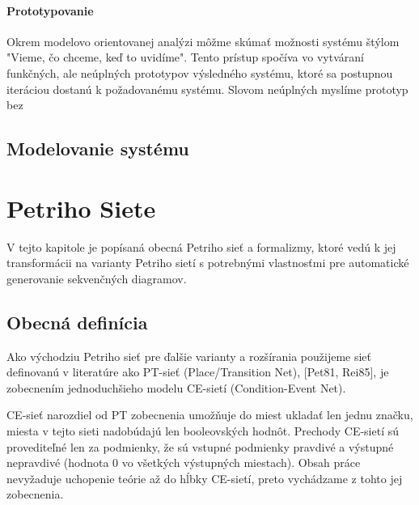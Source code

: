 \subsubsection{Prototypovanie}
Okrem modelovo orientovanej analýzi môžme skúmať možnosti systému štýlom "Vieme, čo chceme, keď to uvidíme". Tento prístup spočíva vo vytváraní funkčných, ale neúplných prototypov výsledného systému, ktoré sa postupnou iteráciou dostanú k požadovanému systému. Slovom neúplných myslíme prototyp bez 
 
  


\section{Modelovanie systému}





\chapter{Petriho Siete}
V tejto kapitole je popísaná obecná Petriho sieť a formalizmy, ktoré vedú k jej transformácii na varianty Petriho sietí s potrebnými vlastnosťmi pre automatické generovanie sekvenčných diagramov.

\section{Obecná definícia}
Ako východziu Petriho sieť pre ďalšie varianty a rozšírania použijeme sieť definovanú v literatúre ako PT-sieť (Place/Transition Net), [Pet81, Rei85], je zobecnením jednoduchšieho modelu CE-sietí (Condition-Event Net).

\begin{note}
	CE-sieť narozdiel od PT zobecnenia umožňuje do miest ukladať len jednu značku, miesta v tejto sieti nadobúdajú len booleovských hodnôt. Prechody CE-sietí sú provediteľné len za podmienky, že sú vstupné podmienky pravdivé a výstupné nepravdivé (hodnota 0 vo všetkých výstupných miestach). Obsah práce nevyžaduje uchopenie teórie až do hĺbky CE-sietí, preto vychádzame z tohto jej zobecnenia. 
\end{note}

